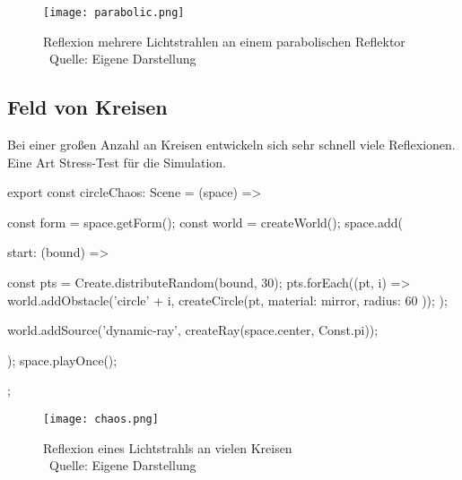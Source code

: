 \begin{figure}
    \centering
    \texttt{[image: parabolic.png]}

    \caption{Reflexion mehrere Lichtstrahlen an einem parabolischen Reflektor  \\ Quelle: Eigene Darstellung}

\end{figure}
\newpage

\subsection*{Feld von Kreisen}
Bei einer großen Anzahl an Kreisen entwickeln sich sehr schnell viele Reflexionen. Eine Art Stress-Test für die Simulation.
\begin{verbnobox}[\scriptsize\mbox{}]
export const circleChaos: Scene = (space) => {
    const form = space.getForm();
    const world = createWorld();
    space.add({
        start: (bound) => {
            const pts = Create.distributeRandom(bound, 30);
            pts.forEach((pt, i) => {
                world.addObstacle('circle' + i, createCircle(pt, { material: mirror, radius: 60 }));
            });

            world.addSource('dynamic-ray', createRay(space.center, Const.pi));
        }
    });
    space.playOnce();
};
\end{verbnobox}

\begin{figure}
    \centering
    \texttt{[image: chaos.png]}

    \caption{Reflexion eines Lichtstrahls an vielen Kreisen \\ Quelle: Eigene Darstellung}

\end{figure}